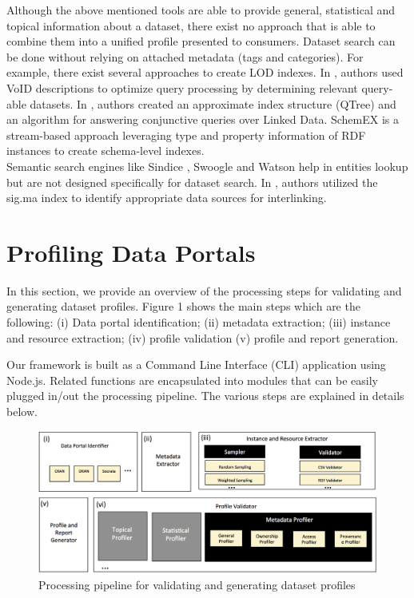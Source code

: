 \documentclass[runningheads,a4paper]{llncs}
\begin{document}
Although the above mentioned tools are able to provide general, statistical and topical information about a dataset, there exist no approach that is able to combine them into a unified profile presented to consumers. Dataset search can be done without relying on attached metadata (tags and categories). For example, there exist several approaches to create LOD indexes. In \cite{Alexander:LDOW09}, authors used VoID descriptions to optimize query processing by determining relevant query-able datasets. In \cite{Harth:2010:DSO:1772690.1772733}, authors created an approximate index structure (QTree) and an algorithm for answering conjunctive queries over Linked Data. SchemEX \cite{Konrath:2012:SEC:2399444.2399563} is a stream-based approach leveraging type and property information of RDF instances to create schema-level indexes.\\
Semantic search engines like Sindice \cite{Delbru2010a}, Swoogle \cite{Ding2004} and Watson \cite{d'Aquin:2011:WMS:2019470.2019476} help in entities lookup but are not designed specifically for dataset search. In \cite{whatShouldILinkTo}, authors utilized the sig.ma index \cite{sig.ma} to identify appropriate data sources for interlinking.


\section{Profiling Data Portals}
\label{sec:framework}

In this section, we provide an overview of the processing steps for validating and generating dataset profiles. Figure 1 shows the main steps which are the following: (i) Data portal identification; (ii) metadata extraction; (iii) instance and resource extraction; (iv) profile validation (v) profile and report generation.

Our framework is built as a Command Line Interface (CLI) application using Node.js. Related functions are encapsulated into modules that can be easily plugged in/out the processing pipeline. The various steps are explained in details below.

\begin{figure}[!ht]
  \centering
    \includegraphics[scale=0.4]{figure-1_architecture.png}
  \caption{Processing pipeline for validating and generating dataset profiles}
\end{figure}
\end{document}
